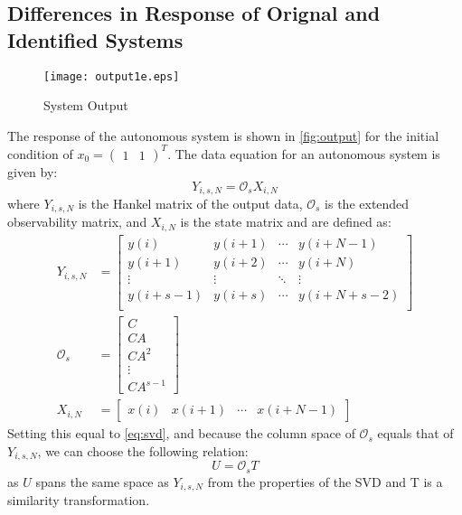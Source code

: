 \documentclass[11pt,a4paper]{article}
\begin{document}
\subsection{Differences in Response of Orignal and Identified Systems}
\begin{figure}
    \centering
    \texttt{[image: output1e.eps]}
    \caption{System Output}
    \label{fig:output}
\end{figure}
The response of the autonomous system is shown in \autoref{fig:output} for the
initial condition of $ x_0 = \begin{pmatrix}1 & 1\end{pmatrix}^T $. The data
equation for an autonomous system is given by:
\begin{equation}
    \label{eq:dataeq}
    Y_{i, s, N} = \mathcal{O}_s X_{i, N}
\end{equation}
where $Y_{i, s, N}$ is the Hankel matrix of the output data, $\mathcal{O}_s$ is
the extended observability matrix, and $X_{i, N}$ is the state matrix and are
defined as:
\begin{align}
    Y_{i, s, N} &=
        \begin{bmatrix}
            y(i) & y(i + 1) & \cdots & y(i + N - 1) \\
            y(i + 1) & y(i + 2) & \cdots & y(i + N) \\
            \vdots & \vdots & \ddots & \vdots \\
            y(i + s - 1) & y(i + s) & \cdots & y(i + N + s - 2) \\
        \end{bmatrix} \label{eq:yhankel} \\
    \mathcal{O}_s &= \begin{bmatrix}
        C \\ CA \\ CA^2 \\ \vdots \\ CA^{s - 1}
        \end{bmatrix} \label{eq:extobs} \\
    X_{i, N} &= \begin{bmatrix} x(i) & x(i + 1) &
        \cdots & x(i + N - 1) \end{bmatrix} \label{eq:xhankel}
\end{align}
Setting this equal to \autoref{eq:svd}, and because the column space of
$\mathcal{O}_s$ equals that of $Y_{i, s, N}$, we can choose the following
relation:
\begin{equation}
    \label{eq:uo}
    U = \mathcal{O}_s T
\end{equation}
as $U$ spans the same space as $Y_{i, s, N}$ from the properties of the SVD and
T is a similarity transformation.
\end{document}
